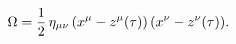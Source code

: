\begin{equation}
\Omega={1 \over 2}\,\eta_{\mu \nu}\,(x^{\mu}-z^{\mu}(\tau))\,(x^{\nu}-z^{\nu}(\tau)).
\label{dist}
\end{equation}

